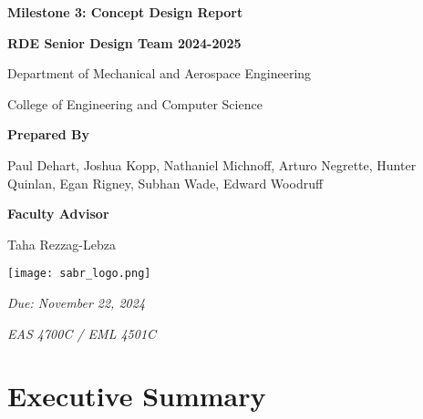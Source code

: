 \begin{titlepage}

    \centering
    
    \begin{minipage}{6.5in}
        \centering
        \hspace{3em}
    \end{minipage}
    \vspace{1em}
    
    \textbf{\Large Milestone 3: Concept Design Report}\par\vspace{4em}
    
    \textbf{RDE Senior Design Team 2024-2025}\par\vspace{0.5em}
    Department of Mechanical and Aerospace Engineering\par\vspace{0.5em}
    College of Engineering and Computer Science\par\vspace{3em}
    
    \textbf{Prepared By}\par\vspace{0.5em}
    Paul Dehart, Joshua Kopp, Nathaniel Michnoff, Arturo Negrette, Hunter Quinlan, Egan Rigney, Subhan Wade, Edward Woodruff\par\vspace{3em}
    
    {\bfseries Faculty Advisor}\par\vspace{0.5em}
    Taha Rezzag-Lebza\par\vspace{2em}
    
    \texttt{[image: sabr\_logo.png]}\par\vspace{2em}
    
    \textit{Due: November 22, 2024}\par\vspace{1em}
    \textit{EAS 4700C / EML 4501C}

\end{titlepage}

\newpage
\thispagestyle{empty}

\section*{Executive Summary}
\doublespacing

